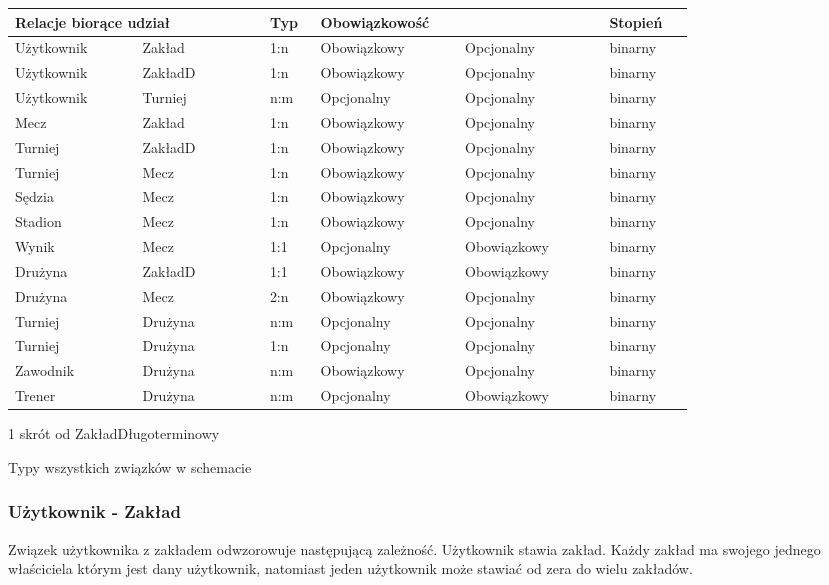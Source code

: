 \documentclass{mwrep}
\begin{document}
\begin{threeparttable}[H]
	\begin{tabular}{|p{0.15\linewidth}|p{0.15\linewidth}|p{0.05\linewidth}|p{0.17\linewidth}|p{0.17\linewidth}|p{0.1\linewidth}|}
	\hline
	\multicolumn{2}{|p{0.3\linewidth}|}{Relacje biorące udział} & Typ & \multicolumn{2}{p{0.3\linewidth}|}{Obowiązkowość} & Stopień         \\ \hline
	Użytkownik & Zakład & 1:n & Obowiązkowy & Opcjonalny & binarny  \\ \hline
	Użytkownik & ZakładD\tnote{1} & 1:n & Obowiązkowy & Opcjonalny & binarny  \\ \hline
	Użytkownik & Turniej & n:m & Opcjonalny & Opcjonalny & binarny  \\ \hline
	Mecz & Zakład & 1:n & Obowiązkowy & Opcjonalny & binarny  \\ \hline
	Turniej & ZakładD\tnote{1} & 1:n & Obowiązkowy & Opcjonalny & binarny  \\ \hline
	Turniej & Mecz & 1:n & Obowiązkowy & Opcjonalny & binarny  \\ \hline
	Sędzia & Mecz & 1:n & Obowiązkowy & Opcjonalny & binarny  \\ \hline
	Stadion & Mecz & 1:n & Obowiązkowy & Opcjonalny & binarny  \\ \hline
	Wynik & Mecz & 1:1 & Opcjonalny & Obowiązkowy & binarny  \\ \hline
	Drużyna & ZakładD\tnote{1} & 1:1 & Obowiązkowy & Obowiązkowy & binarny \\ \hline
	Drużyna & Mecz & 2:n & Obowiązkowy & Opcjonalny & binarny  \\ \hline
	Turniej & Drużyna & n:m & Opcjonalny & Opcjonalny & binarny \\ \hline 
	Turniej & Drużyna & 1:n & Opcjonalny & Opcjonalny & binarny \\ \hline 
	Zawodnik & Drużyna & n:m & Obowiązkowy & Opcjonalny & binarny  \\ \hline
	Trener & Drużyna & n:m & Opcjonalny & Obowiązkowy & binarny  \\ \hline
	\end{tabular}
	\begin{tablenotes}
		\item [1] skrót od ZakładDługoterminowy
	\end{tablenotes}	
	\caption{Typy wszystkich związków w schemacie}
\end{threeparttable}

\subsubsection{Użytkownik - Zakład}
Związek użytkownika z zakładem odwzorowuje następującą zależność. Użytkownik stawia zakład. Każdy zakład ma swojego jednego właściciela którym jest dany użytkownik, natomiast jeden użytkownik może stawiać od zera do wielu zakładów.
\end{document}
